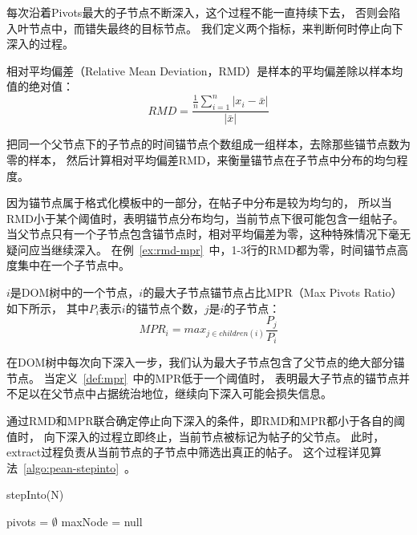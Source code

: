 每次沿着Pivots最大的子节点不断深入，这个过程不能一直持续下去，
否则会陷入叶节点中，而错失最终的目标节点。
我们定义两个指标，来判断何时停止向下深入的过程。

\begin{definition}
\label{def:rmd}
相对平均偏差（Relative Mean Deviation，RMD）是样本的平均偏差除以样本均值的绝对值：
\begin{equation}
RMD = \frac{\frac{1}{n} \sum_{i=1}^{n} \vert x_i - \bar x \vert}
{\vert \bar x \vert}
\end{equation}
\end{definition}

把同一个父节点下的子节点的时间锚节点个数组成一组样本，去除那些锚节点数为零的样本，
然后计算相对平均偏差RMD，来衡量锚节点在子节点中分布的均匀程度。

因为锚节点属于格式化模板中的一部分，在帖子中分布是较为均匀的，
所以当RMD小于某个阈值时，表明锚节点分布均匀，当前节点下很可能包含一组帖子。
当父节点只有一个子节点包含锚节点时，相对平均偏差为零，这种特殊情况下毫无疑问应当继续深入。
在例~\ref{ex:rmd-mpr}~中，1-3行的RMD都为零，时间锚节点高度集中在一个子节点中。

\begin{definition}
\label{def:mpr}
$i$是DOM树中的一个节点，$i$的最大子节点锚节点占比MPR（Max Pivots Ratio）如下所示，
其中$P_i$表示$i$的锚节点个数，$j$是$i$的子节点：
\begin{equation}
MPR_i = max_{j \in children(i)} \frac{P_j}{P_i}
\end{equation}
\end{definition}

在DOM树中每次向下深入一步，我们认为最大子节点包含了父节点的绝大部分锚节点。
当定义~\ref{def:mpr}~中的MPR低于一个阈值时，
表明最大子节点的锚节点并不足以在父节点中占据统治地位，继续向下深入可能会损失信息。

通过RMD和MPR联合确定停止向下深入的条件，即RMD和MPR都小于各自的阈值时，
向下深入的过程立即终止，当前节点被标记为帖子的父节点。
此时，extract过程负责从当前节点的子节点中筛选出真正的帖子。
这个过程详见算法~\ref{algo:pean-stepinto}~。

\begin{algorithm}[t]
\caption{stepInto(N)}
\label{algo:pean-stepinto}

pivots = $\emptyset$ \;
maxNode = null \;

\end{algorithm}

